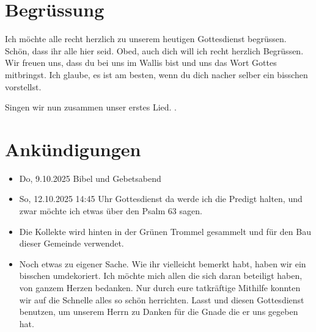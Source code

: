 \documentclass{../../inc/mybib}
\begin{document}
\section{Begrüssung}
Ich möchte alle recht herzlich zu unserem heutigen Gottesdienst begrüssen. Schön, dass ihr alle hier seid. Obed, auch dich will ich recht herzlich Begrüssen. Wir freuen uns, dass du bei uns im Wallis bist und uns das Wort Gottes mitbringst. Ich glaube, es ist am besten, wenn du dich nacher selber ein bisschen vorstellst.

\beten{}

Singen wir nun zusammen unser erstes Lied.
{}.

\section{Ankündigungen}
\begin{itemize}
    \item {} Do,  9.10.2025 Bibel und Gebetsabend
    \item {} So, 12.10.2025 14:45 Uhr Gottesdienst da werde ich die Predigt halten, und zwar möchte ich etwas über den Psalm 63 sagen.    
    \item Die Kollekte wird hinten in der Grünen Trommel gesammelt und für den Bau dieser Gemeinde verwendet.
    \item Noch etwas zu eigener Sache. Wie ihr vielleicht bemerkt habt, haben wir ein bisschen umdekoriert. Ich möchte mich allen die sich daran beteiligt haben, von ganzem Herzen bedanken. Nur durch eure tatkräftige Mithilfe konnten wir auf die Schnelle alles so schön herrichten. Lasst und diesen Gottesdienst benutzen, um unserem Herrn zu Danken für die Gnade die er uns gegeben hat.
\end{itemize}
\end{document}
